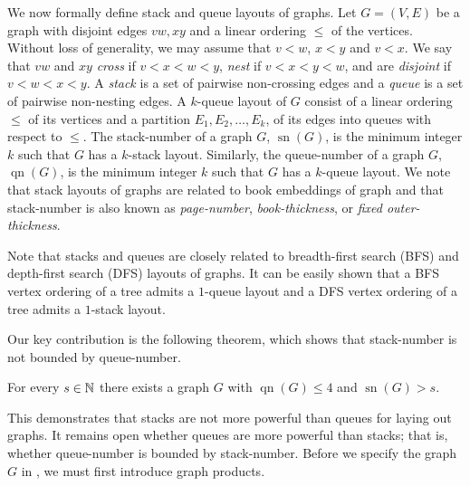 \documentclass[kpfonts]{patmorin}
\DeclareMathOperator{\sn}{sn}
\DeclareMathOperator{\qn}{qn}
\renewcommand{\le}{\leqslant}
\renewcommand{\leq}{\leqslant}
\begin{document}
We now formally define stack and queue layouts of graphs. Let $G=(V,E)$ be a graph with disjoint edges $vw, xy$ and a linear ordering $\leq$ of the vertices. Without loss of generality, we may assume that $v < w$, $x <y$ and $v < x$. We say that $vw$ and $xy$ \textit{cross} if $v<x<w<y$,  \textit{nest} if $v <x <y < w$, and are \textit{disjoint} if $v <w<x<y$. A \textit{stack} is a set of pairwise non-crossing edges and a \textit{queue} is a set of pairwise non-nesting edges. A $k$-queue layout of $G$ consist of a linear ordering $\leq$ of its vertices and a partition $E_1,E_2, \dots, E_k$, of its edges into queues with respect to $\leq$. The stack-number of a graph $G$, $\sn(G)$, is the minimum integer $k$ such that $G$ has a $k$-stack layout. Similarly, the queue-number of a graph $G$, $\qn(G)$, is the minimum integer $k$ such that $G$ has a $k$-queue layout. We note that stack layouts of graphs are related to book embeddings of graph and that stack-number is also known as \textit{page-number}, \textit{book-thickness}, or \textit{fixed outer-thickness}.

Note that stacks and queues are closely related to breadth-first search (BFS) and depth-first search (DFS) layouts of graphs. It can be easily shown that a BFS vertex ordering of a tree admits a $1$-queue layout and a DFS vertex ordering of a tree admits a $1$-stack layout. 


Our key contribution is the following theorem, which shows that stack-number is not bounded by queue-number. 

\begin{thm}\label{family}
	For every $s\in \mathbb{N}$ there exists a graph $G$ with $\qn(G)\le 4$ and $\sn(G)>s$.
\end{thm}

This demonstrates that stacks are not more powerful than queues for laying out graphs. It remains open whether queues are more powerful than stacks; that is, whether queue-number is bounded by stack-number. Before we specify the graph $G$ in , we must first introduce graph products.
\end{document}
